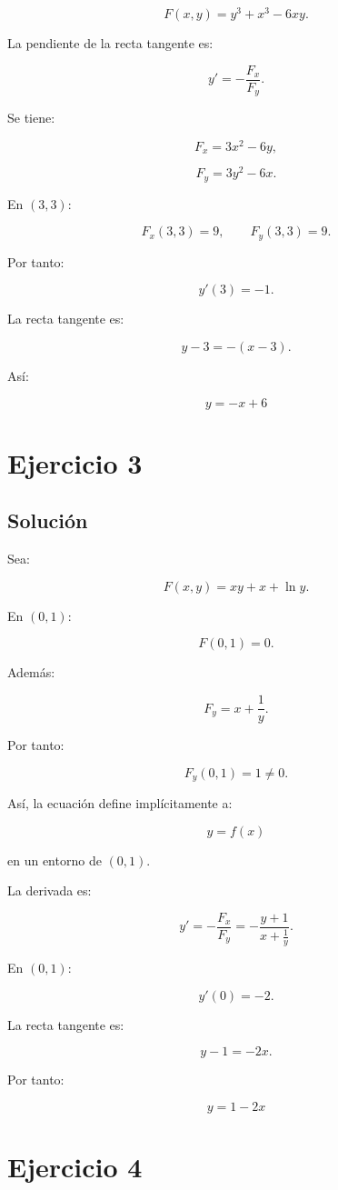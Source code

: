 \documentclass[11pt,a4paper]{article}
\begin{document}
\[
F(x,y)=y^3+x^3-6xy.
\]

La pendiente de la recta tangente es:

\[
y'
=
-\frac{F_x}{F_y}.
\]

Se tiene:

\[
F_x=3x^2-6y,
\]

\[
F_y=3y^2-6x.
\]

En \((3,3)\):

\[
F_x(3,3)=9,
\qquad
F_y(3,3)=9.
\]

Por tanto:

\[
y'(3)=-1.
\]

La recta tangente es:

\[
y-3=-(x-3).
\]

Así:

\[
\boxed{
y=-x+6
}
\]

\section{Ejercicio 3}
\subsection{Solución}

Sea:

\[
F(x,y)=xy+x+\ln y.
\]

En \((0,1)\):

\[
F(0,1)=0.
\]

Además:

\[
F_y=x+\frac1y.
\]

Por tanto:

\[
F_y(0,1)=1\neq0.
\]

Así, la ecuación define implícitamente a:

\[
y=f(x)
\]

en un entorno de \((0,1)\).

La derivada es:

\[
y'
=
-\frac{F_x}{F_y}
=
-\frac{y+1}{x+\frac1y}.
\]

En \((0,1)\):

\[
y'(0)=-2.
\]

La recta tangente es:

\[
y-1=-2x.
\]

Por tanto:

\[
\boxed{
y=1-2x
}
\]

\section{Ejercicio 4}
\end{document}
